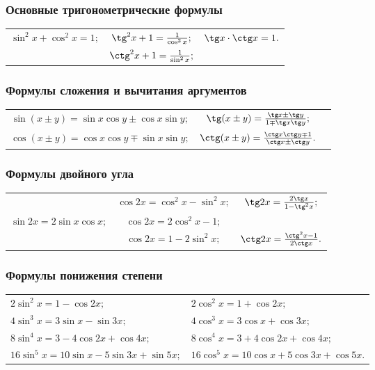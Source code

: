 \subsubsection{Основные тригонометрические формулы}
\noindent\begin{tabular}{ c c c }
\multirow{2}{*}{$\sin^2x+\cos^2x=1;$}
&
$\tg^2x+1=\frac{1}{\cos^2x};$
&
\multirow{2}{*}{$\tg x\cdot\ctg x=1.$}
\\
&
$\ctg^2x+1=\frac{1}{\sin^2x};$
&
\end{tabular}

\subsubsection{Формулы сложения и вычитания аргументов}
\noindent\begin{tabular}{ c c c}
$\sin(x\pm y)=\sin x \cos y \pm \cos x \sin y;$
&
$\tg(x\pm y)=\frac{\tg x \pm \tg y}{1 \mp \tg x\tg y};$
\\
$\cos(x\pm y)= \cos x \cos y \mp \sin x \sin y;$
&
$\ctg(x\pm y)=\frac{\ctg x\ctg y \mp 1}{\ctg x \pm \ctg y}.$
\end{tabular}

\subsubsection{Формулы двойного угла}
\noindent\begin{tabular}{ c c c }
&
$\cos 2x = \cos^2 x - \sin^2 x;$
&
\multirow{1}{*}{$\tg 2x = \frac{2\tg x}{1-\tg^2x};$}
\\
$\sin 2x = 2\sin x \cos x;$
&
$\cos 2x = 2\cos^2 x - 1; $
&
\\
&
$\cos 2x = 1 - 2\sin^2 x;$
&
$\ctg 2x = \frac{\ctg^2x-1}{2\ctg x}.$
\end{tabular}

\subsubsection{Формулы понижения степени}
\begin{tabular}{ l l }
$2\sin^2x=1-\cos 2x;$
&
$2\cos^2x=1+\cos 2x;$
\\
$4\sin^3x=3\sin x-\sin 3x;$
&
$4\cos^3x=3\cos x+\cos 3x;$
\\
$8\sin^4x=3-4\cos2x+\cos4x;$
&
$8\cos^4x=3+4\cos2x+\cos4x;$
\\
$16\sin^5x=10\sin x-5\sin 3x +\sin 5x;$
&
$16\cos^5x=10\cos x+5\cos 3x +\cos 5x.$
\end{tabular}

